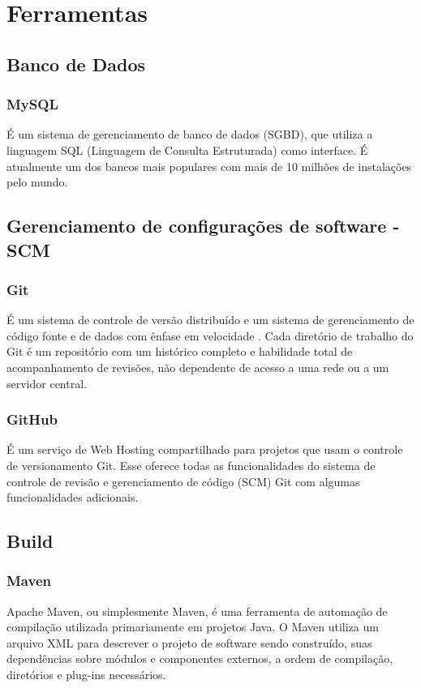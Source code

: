 \chapter{Ferramentas}
    \section{Banco de Dados}
	\subsection{MySQL} É um sistema de gerenciamento de banco de dados (SGBD), 
	que utiliza a linguagem SQL (Linguagem de Consulta Estruturada) como 
	interface. É atualmente um dos bancos mais populares com mais de 10 
	milhões de instalações pelo mundo.

    \section{Gerenciamento de configurações de software - SCM}

	\subsection{Git} É um sistema de controle de versão distribuído e um 
	sistema de gerenciamento de código fonte e de dados com ênfase em velocidade 
	\cite{loeliger2012version}. 
	Cada diretório de trabalho do Git é um repositório com um histórico 
	completo e habilidade total de acompanhamento de revisões, não 
	dependente de acesso a uma rede ou a um servidor central.

	\subsection{GitHub} É um serviço de Web Hosting compartilhado 
	para projetos que usam o controle de versionamento Git. 
	Esse oferece todas as funcionalidades do sistema de controle de 
	revisão e gerenciamento de código (SCM) Git com algumas 
	funcionalidades adicionais.

    \section{Build}

	\subsection{Maven} Apache Maven, ou simplesmente Maven, é uma 
	ferramenta de automação de compilação utilizada primariamente 
	em projetos Java. O Maven utiliza um arquivo XML para descrever 
	o projeto de software sendo construído, suas dependências sobre 
	módulos e componentes externos, a ordem de compilação, 
	diretórios e plug-ins necessários.

